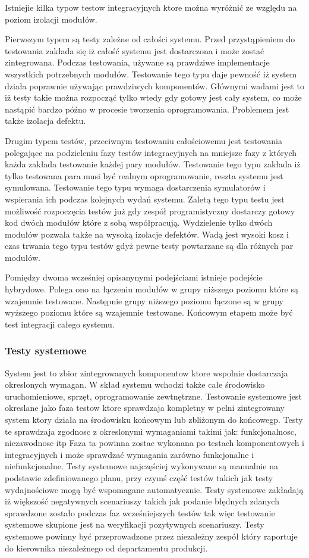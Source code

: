 Istniejie kilka typow testow integracyjnych ktore można wyróżnić ze względu na poziom izolacji modułów.

Pierwszym typem są testy zależne od całości systemu. Przed przystąpieniem do testowania zakłada się iż całość systemu jest dostarczona i może zostać zintegrowana.  Podczas testowania, używane są prawdziwe implementacje wszystkich potrzebnych modułów. Testowanie tego typu daje pewność iż system działa poprawnie używając prawdziwych komponentów. Głównymi wadami jest to iż testy takie można rozpocząć tylko wtedy gdy gotowy jest cały system, co może nastąpić bardzo późno w procesie tworzenia oprogramowania. Problemem jest także izolacja defektu.

Drugim typem testów, przeciwnym testowaniu całościowemu jest testowania polegające na podzieleniu fazy testów integracyjnych na mniejsze fazy z których każda zakłada testowanie każdej pary modułów. Testowanie tego typu zakłada iż tylko testowana para musi być realnym oprogramowanie, reszta systemu jest symulowana. Testowanie tego typu wymaga dostarczenia symulatorów i wspierania ich podczas kolejnych wydań systemu. Zaletą tego typu testu jest możliwość rozpoczęcia testów już gdy zespół programistyczny dostarczy gotowy kod dwóch modułów które z sobą współpracują. Wydzielenie tylko dwóch modułów pozwala także na wysoką izolacje defektów. Wadą jest wysoki kosz i czas trwania tego typu testów gdyż pewne testy powtarzane są dla różnych par modułów.

Pomiędzy dwoma wcześniej opisanynymi podejściami istnieje podejście hybrydowe. Polega ono na łączeniu modułów w grupy niższego poziomu które są wzajemnie testowane. Następnie grupy niższego poziomu łączone są w grupy wyższego poziomu które są wzajemnie testowane. Końcowym etapem może być test integracji całego systemu.
\subsubsection{Testy systemowe}
System jest to zbior zintegrowanych komponentow ktore wspolnie dostarczaja okreslonych wymagan. W skład systemu wchodzi także całe środowisko uruchomieniowe, sprzęt, oprogramowanie zewtnętrzne. Testowanie systemowe jest okreslane jako faza testow ktore sprawdzaja kompletny w pelni zintegrowany system ktory działa na środowisku końcowym lub zbliżonym do końcowegp. Testy te sprawdzaja zgodnosc z okreslonymi wymaganiami takimi jak: funkcjonalnosc, niezawodnosc itp
Faza ta powinna zostac wykonana po testach komponentowych i integracyjnych i może sprawdzać wymagania zarówno funkcjonalne i niefunkcjonalne.
Testy systemowe najczęściej wykonywane są manualnie na podstawie zdefiniowanego planu, przy czymś część testów takich jak testy wydajnościowe mogą być wspomagane automatycznie.
Testy systemowe zakładają iż większość negatywnych scenariuszy takich jak podanie błędnych zdanych sprawdzone zostało podczas faz wcześniejszych testów tak więc testowanie systemowe skupione jest na weryfikacji pozytywnych scenariuszy. 
Testy systemowe powinny być przeprowadzone przez niezależny zespół który raportuje do kierownika niezależnego od departamentu produkcji. 

